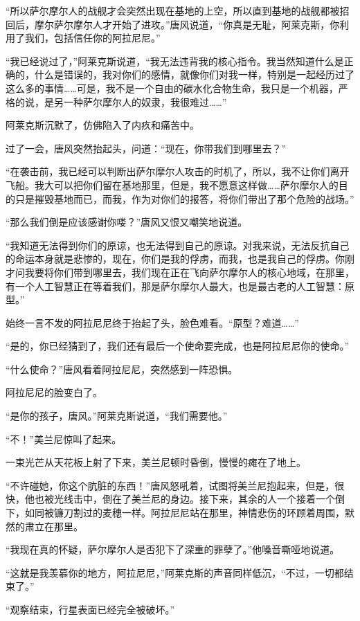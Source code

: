“所以萨尔摩尔人的战舰才会突然出现在基地的上空，所以直到基地的战舰都被招回后，摩尔萨尔摩尔人才开始了进攻。”唐风说道，“你真是无耻，阿莱克斯，你利用了我们，包括信任你的阿拉尼尼。” 

“我已经说过了，”阿莱克斯说道，“我无法违背我的核心指令。我当然知道什么是正确的，什么是错误的，我对你们的感情，就像你们对我一样，特别是一起经历过了这么多的事情……可是，我不是一个自由的碳水化合物生命，我只是一个机器，严格的说，是另一种萨尔摩尔人的奴隶，我很难过……” 

阿莱克斯沉默了，仿佛陷入了内疚和痛苦中。 

过了一会，唐风突然抬起头，问道：“现在，你带我们到哪里去？” 

“在袭击前，我已经可以判断出萨尔摩尔人攻击的时机了，所以，我不让你们离开飞船。我大可以把你们留在基地那里，但是，我不愿意这样做……萨尔摩尔人的目的只是摧毁基地而已，而我，作为对你们的报答，将你们带出了那个危险的战场。” 

“那么我们倒是应该感谢你喽？”唐风又恨又嘲笑地说道。 

“我知道无法得到你们的原谅，也无法得到自己的原谅。对我来说，无法反抗自己的命运本身就是悲惨的，现在，你们是我的俘虏，而我，也是我自己的俘虏。你刚才问我要将你们带到哪里去，我们现在正在飞向萨尔摩尔人的核心地域，在那里，有一个人工智慧正在等着我们，那是萨尔摩尔人最大，也是最古老的人工智慧：原型。” 

始终一言不发的阿拉尼尼终于抬起了头，脸色难看。“原型？难道……” 

“是的，你已经猜到了，我们还有最后一个使命要完成，也是阿拉尼尼你的使命。” 

“什么使命？”唐风看着阿拉尼尼，突然感到一阵恐惧。 

阿拉尼尼的脸变白了。 

“是你的孩子，唐风。”阿莱克斯说道，“我们需要他。” 

“不！”美兰尼惊叫了起来。 

一束光芒从天花板上射了下来，美兰尼顿时昏倒，慢慢的瘫在了地上。 

“不许碰她，你这个肮脏的东西！”唐风怒吼着，试图将美兰尼抱起来，但是，很快，他也被光线击中，倒在了美兰尼的身边。接下来，其余的人一个接着一个倒下，如同被镰刀割过的麦穗一样。阿拉尼尼站在那里，神情悲伤的环顾着周围，默然的肃立在那里。 

“我现在真的怀疑，萨尔摩尔人是否犯下了深重的罪孽了。”他嗓音嘶哑地说道。 

“这就是我羡慕你的地方，阿拉尼尼，”阿莱克斯的声音同样低沉，“不过，一切都结束了。” 

“观察结束，行星表面已经完全被破坏。” 

